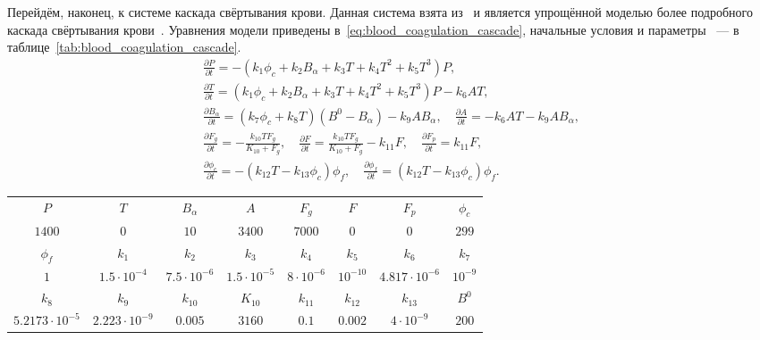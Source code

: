Перейдём, наконец, к системе каскада свёртывания крови.
Данная система взята из~\cite{bouchnita2020mathematical, vassilevski2020parallel}
и является упрощённой моделью более подробного каскада свёртывания крови~\cite{panteleev2008coagulation, ushakova2018gemo}.
Уравнения модели приведены в~\eqref{eq:blood_coagulation_cascade}, начальные условия и параметры ~--- в таблице~\ref{tab:blood_coagulation_cascade}.
%
\begin{equation}
    \label{eq:blood_coagulation_cascade}
    \begin{aligned}
        \frac{\partial P}{\partial t} = - \left(k_1 \phi_c + k_2 B_\alpha + k_3 T + k_4 T^2 + k_5 T^3\right) P,
        \\
        \frac{\partial T}{\partial t} = \left(k_1 \phi_c + k_2 B_\alpha + k_3 T + k_4 T^2 + k_5 T^3 \right) P - k_6 A T,
        \\
        \frac{\partial B_\alpha}{\partial t} =  \left(k_7 \phi_c + k_8 T \right) \left( B^0 - B_\alpha \right) - k_9 A B_\alpha,
        \quad
        \frac{\partial A}{\partial t} = -k_6 A T - k_9 A B_\alpha,
        \\
        \frac{\partial F_g}{\partial t} = -\frac{k_{10} T F_g}{K_{10} + F_g},
        \quad
        \frac{\partial F}{\partial t} = \frac{k_{10} T F_g}{K_{10} + F_g} - k_{11} F,
        \quad
        \frac{\partial F_p} {\partial t} = k_{11} F,
        \\
        \frac{\partial \phi_c}{\partial t}  = - \left( k_{12} T - k_{13} \phi_c \right) \phi_f,
        \quad
        \frac{\partial \phi_f}{\partial t} = \left( k_{12} T - k_{13} \phi_c \right) \phi_f.
    \end{aligned}
\end{equation}

\begin{sidewaystable}[p!]
	\centering

    \caption{Начальные условия и параметры модели (каскад свёртывания крови).}
	\label{tab:blood_coagulation_cascade}

	\begin{tabular}{cccccccc}
		\hline
		$ P $ & $ T $ & $ B_{\alpha} $ & $ A $ & $ F_g $ & $ F $ & $ F_p $ & $ \phi_c $  \\
		$ 1400 $ & $ 0 $ & $ 10 $ & $ 3400 $ & $ 7000 $ & $ 0 $ & $ 0 $ & $ 299 $  \\
		\hline
		 $ \phi_f $ & $ k_1 $ & $ k_2 $ & $ k_3 $ & $ k_4 $ & $ k_5 $ & $ k_6 $ & $ k_7 $   \\
		$ 1 $   & $ 1.5 \cdot 10^{-4} $ & $ 7.5 \cdot 10^{-6} $ & $ 1.5 \cdot 10^{-5} $ & $ 8 \cdot 10^{-6} $ & $ 10^{-10} $ & $ 4.817 \cdot 10^{-6} $ & $ 10^{-9} $ \\
		\hline
		$ k_8 $ & $ k_9 $ & $ k_{10} $ & $ K_{10} $ & $ k_{11} $ & $ k_{12} $ & $ k_{13} $ & $ B^0 $ \\
		 $ 5.2173 \cdot 10^{-5} $  & $ 2.223 \cdot 10^{-9} $ & $ 0.005 $ & $ 3160 $ & $ 0.1 $ & $ 0.002 $ & $ 4 \cdot 10^{-9} $ & $ 200 $ \\
		\hline
	\end{tabular}
\end{sidewaystable}

